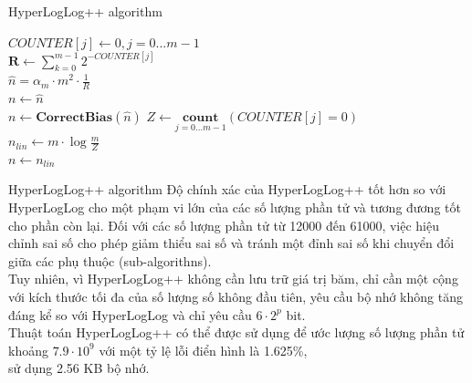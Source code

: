 \documentclass[10pt]{beamer}
\begin{document}
\begin{frame}{HyperLogLog++ algorithm}
  \begin{algorithm}[H]
    \vspace{0.25cm}
    \DontPrintSemicolon
    \LinesNumberedHidden
    \caption[]{Estimating cardinality with \textit{HyperLogLog++}}
    $COUNTER[j] \gets 0, j = 0 ... m-1$\\
    $\textbf{R} \gets \sum\limits_{k=0}^{m-1}2^{-COUNTER[j]}$\\
    $\hat{n} = \alpha_m \cdot m^2 \cdot \frac{1}{R}$\\
    $n \gets \hat{n}$\\
    {
        $n \gets \textbf{CorrectBias}(\hat{n})$
    }
    $Z \gets \underset{j=0...m-1}{\textbf{count}}(COUNTER[j] = 0)$\\
    {
        $n_{lin} \gets m \cdot \log\frac{m}{Z}$\\
        {
            $n \gets n_{lin}$
        }
    }
    \vspace{0.25cm}
\end{algorithm}
\end{frame}
\begin{frame}{HyperLogLog++ algorithm}
  Độ chính xác của HyperLogLog++ tốt hơn so với HyperLogLog cho một phạm vi lớn của các số lượng phần tử và tương đương tốt cho phần còn lại. 
  Đối với các số lượng phần tử từ 12000 đến 61000, việc hiệu chỉnh sai số cho phép giảm thiểu sai số và tránh một đỉnh sai số khi chuyển đổi 
  giữa các phụ thuộc (sub-algorithns).\\
  
  Tuy nhiên, vì HyperLogLog++ không cần lưu trữ giá trị băm, chỉ cần một cộng với kích thước tối đa của số lượng số không đầu tiên, yêu cầu bộ nhớ 
  không tăng đáng kể so với HyperLogLog và chỉ yêu cầu $6 \cdot 2^p$ bit.\\
  
  Thuật toán HyperLogLog++ có thể được sử dụng để ước lượng số lượng phần tử \\
  khoảng $7.9 \cdot 10^9$ với một tỷ lệ lỗi điển hình là 1.625\%, \\
  sử dụng 2.56 KB bộ nhớ.
\end{frame}
\end{document}
